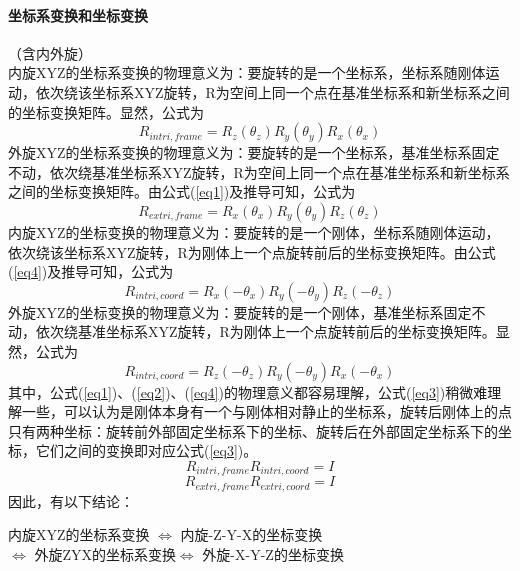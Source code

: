 \paragraph{坐标系变换和坐标变换}（含内外旋）
\\
内旋XYZ的坐标系变换的物理意义为：要旋转的是一个坐标系，坐标系随刚体运动，依次绕该坐标系XYZ旋转，R为空间上同一个点在基准坐标系和新坐标系之间的坐标变换矩阵。显然，公式为
\begin{equation}
  R_{intri,frame}=R_z(\theta_z) R_y(\theta_y) R_x(\theta_x) \label{eq1}
\end{equation}
外旋XYZ的坐标系变换的物理意义为：要旋转的是一个坐标系，基准坐标系固定不动，依次绕基准坐标系XYZ旋转，R为空间上同一个点在基准坐标系和新坐标系之间的坐标变换矩阵。由公式(\ref{eq1})及推导可知，公式为
\begin{equation}
  R_{extri,frame}=R_x(\theta_x) R_y(\theta_y) R_z(\theta_z) \label{eq2}
\end{equation}
内旋XYZ的坐标变换的物理意义为：要旋转的是一个刚体，坐标系随刚体运动，依次绕该坐标系XYZ旋转，R为刚体上一个点旋转前后的坐标变换矩阵。由公式(\ref{eq4})及推导可知，公式为
\begin{equation}
  R_{intri,coord}=R_x(-\theta_x) R_y(-\theta_y) R_z(-\theta_z) \label{eq3}
\end{equation}
外旋XYZ的坐标变换的物理意义为：要旋转的是一个刚体，基准坐标系固定不动，依次绕基准坐标系XYZ旋转，R为刚体上一个点旋转前后的坐标变换矩阵。显然，公式为
\begin{equation}
  R_{intri,coord}=R_z(-\theta_z) R_y(-\theta_y) R_x(-\theta_x) \label{eq4}
\end{equation}
其中，公式(\ref{eq1})、(\ref{eq2})、(\ref{eq4})的物理意义都容易理解，公式(\ref{eq3})稍微难理解一些，可以认为是刚体本身有一个与刚体相对静止的坐标系，旋转后刚体上的点只有两种坐标：旋转前外部固定坐标系下的坐标、旋转后在外部固定坐标系下的坐标，它们之间的变换即对应公式(\ref{eq3})。
\begin{equation}
  R_{intri,frame} R_{intri,coord} = I
\end{equation}
\begin{equation}
  R_{extri,frame} R_{extri,coord} = I
\end{equation}
因此，有以下结论：
\begin{center}
  \footnotesize 内旋XYZ的坐标系变换	$\Leftrightarrow$ 内旋-Z-Y-X的坐标变换
  \\
  $\Leftrightarrow$ 外旋ZYX的坐标系变换$\Leftrightarrow$ 外旋-X-Y-Z的坐标变换
\end{center}

